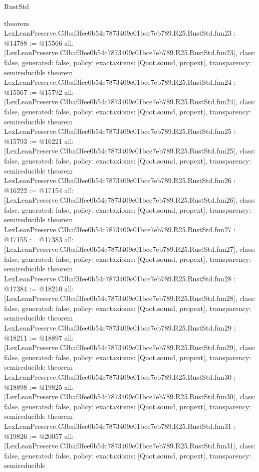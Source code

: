 \begin{lexlean}{RustStd}
\begin{coremodule}
{}
theorem LexLeanPreserve.C3baf3fee0b54c7873409c01bce7eb789.R25.RustStd.fun23 : @14788 := @15566 {
  all: [LexLeanPreserve.C3baf3fee0b54c7873409c01bce7eb789.R25.RustStd.fun23],
  class: false,
  generated: false,
  policy: exact{axioms: [Quot.sound, propext]},
  transparency: semireducible
}
theorem LexLeanPreserve.C3baf3fee0b54c7873409c01bce7eb789.R25.RustStd.fun24 : @15567 := @15792 {
  all: [LexLeanPreserve.C3baf3fee0b54c7873409c01bce7eb789.R25.RustStd.fun24],
  class: false,
  generated: false,
  policy: exact{axioms: [Quot.sound, propext]},
  transparency: semireducible
}
theorem LexLeanPreserve.C3baf3fee0b54c7873409c01bce7eb789.R25.RustStd.fun25 : @15793 := @16221 {
  all: [LexLeanPreserve.C3baf3fee0b54c7873409c01bce7eb789.R25.RustStd.fun25],
  class: false,
  generated: false,
  policy: exact{axioms: [Quot.sound, propext]},
  transparency: semireducible
}
theorem LexLeanPreserve.C3baf3fee0b54c7873409c01bce7eb789.R25.RustStd.fun26 : @16222 := @17154 {
  all: [LexLeanPreserve.C3baf3fee0b54c7873409c01bce7eb789.R25.RustStd.fun26],
  class: false,
  generated: false,
  policy: exact{axioms: [Quot.sound, propext]},
  transparency: semireducible
}
theorem LexLeanPreserve.C3baf3fee0b54c7873409c01bce7eb789.R25.RustStd.fun27 : @17155 := @17383 {
  all: [LexLeanPreserve.C3baf3fee0b54c7873409c01bce7eb789.R25.RustStd.fun27],
  class: false,
  generated: false,
  policy: exact{axioms: [Quot.sound, propext]},
  transparency: semireducible
}
theorem LexLeanPreserve.C3baf3fee0b54c7873409c01bce7eb789.R25.RustStd.fun28 : @17384 := @18210 {
  all: [LexLeanPreserve.C3baf3fee0b54c7873409c01bce7eb789.R25.RustStd.fun28],
  class: false,
  generated: false,
  policy: exact{axioms: [Quot.sound, propext]},
  transparency: semireducible
}
theorem LexLeanPreserve.C3baf3fee0b54c7873409c01bce7eb789.R25.RustStd.fun29 : @18211 := @18897 {
  all: [LexLeanPreserve.C3baf3fee0b54c7873409c01bce7eb789.R25.RustStd.fun29],
  class: false,
  generated: false,
  policy: exact{axioms: [Quot.sound, propext]},
  transparency: semireducible
}
theorem LexLeanPreserve.C3baf3fee0b54c7873409c01bce7eb789.R25.RustStd.fun30 : @18898 := @19825 {
  all: [LexLeanPreserve.C3baf3fee0b54c7873409c01bce7eb789.R25.RustStd.fun30],
  class: false,
  generated: false,
  policy: exact{axioms: [Quot.sound, propext]},
  transparency: semireducible
}
theorem LexLeanPreserve.C3baf3fee0b54c7873409c01bce7eb789.R25.RustStd.fun31 : @19826 := @20057 {
  all: [LexLeanPreserve.C3baf3fee0b54c7873409c01bce7eb789.R25.RustStd.fun31],
  class: false,
  generated: false,
  policy: exact{axioms: [Quot.sound, propext]},
  transparency: semireducible
}
\end{coremodule}
\end{lexlean}
